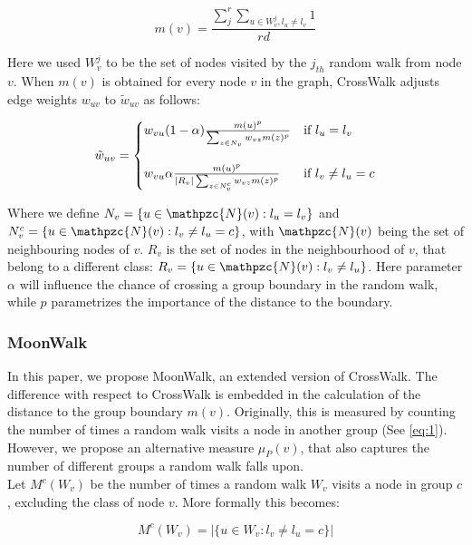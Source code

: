 \begin{equation}
    m(v) = \frac{\sum_j^r\sum_{u \in W_v^j, l_u \neq l_v}1}{rd}
    \label{eq:1}
\end{equation}

Here we used $W_v^j$ to be the set of nodes visited by the $j_{th}$ random walk from node $v$. When $m(v)$ is obtained for every node $v$ in the graph, CrossWalk adjusts edge weights $w_{uv}$ to $\tilde{w}_{uv}$ as follows:

\begin{equation}
    \Tilde{w}_{uv} = 
    \begin{cases}
    w_{vu}(1-\alpha)\frac{m(u)^p}{\sum_{z\in N_v}w_{vz}m(z)^p}  & \text{if $l_u = l_v$}\\\\
    w_{vu}\alpha\frac{m(u)^p}{|R_v|\sum_{z\in N_v^c}w_{vz}m(z)^p}  & \text{if $l_v \neq l_u =c$}\\
    \end{cases}
    \label{eq:2}
\end{equation}

Where we define $N_v = \{u \in \mathpzc{N}(v) : l_u = l_v\}$ and $N_v^c = \{u \in \mathpzc{N}(v) : l_v \neq l_u=c\}$, with $\mathpzc{N}(v)$ being the set of neighbouring nodes of $v$. $R_v$ is the set of nodes in the neighbourhood of $v$, that belong to a different class: $R_v = \{u \in \mathpzc{N}(v): l_v \neq l_u\}$. Here parameter $\alpha$ will influence the chance of crossing a group boundary in the random walk, while $p$ parametrizes the importance of the distance to the boundary.


\subsubsection{MoonWalk}

In this paper, we propose MoonWalk, an extended version of CrossWalk. The difference with respect to CrossWalk is embedded in the calculation of the distance to the group boundary $m(v)$. Originally, this is measured by counting the number of times a random walk visits a node in another group (See \eqref{eq:1}). However, we propose an alternative measure $\mu_P(v)$, that also captures the number of different groups a random walk falls upon.\\

Let $M^c(W_v)$ be the number of times a random walk $W_v$ visits a node in group $c$, excluding the class of node $v$. More formally this becomes:

\begin{equation}
    M^c(W_v) = |\{u \in W_v : l_v \neq l_u = c\}|
\end{equation}

